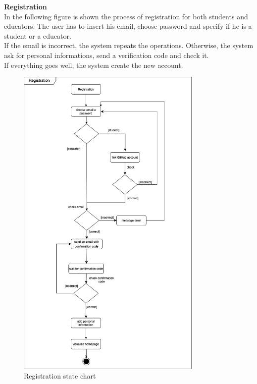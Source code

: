 \textbf{Registration}\\
In the following figure is shown the process of registration for both students and educators. 
The user has to insert his email, choose  password and specify if he is a student or a educator.\\
If the email is incorrect, the system repeats the operations. Otherwise, the system ask for personal informations,
 send a verification code and check it.\\If everything goes well, the system create the new account.
\begin{figure} [H]
  \centering
  \includegraphics[width=0.80\textwidth]{images/state_diagrams/Registration.jpg}
  \caption{Registration state chart}
\end{figure} \vspace{1cm}

